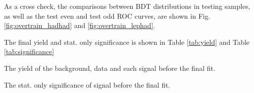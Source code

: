 

As a cross check, the comparisons between BDT distributions in testing samples, as well as the test even and test odd ROC curves, are shown in Fig. \ref{fig:overtrain_hadhad} and \ref{fig:overtrain_lephad}.



The final yield and stat. only significance is shown in Table \ref{tab:yield} and Table \ref{tab:significance}

\begin{table}
\caption{The yield of the background, data and each signal before the final fit.}



\end{table}

\begin{table}
\caption{The stat. only significance of signal before the final fit.}



\end{table}
